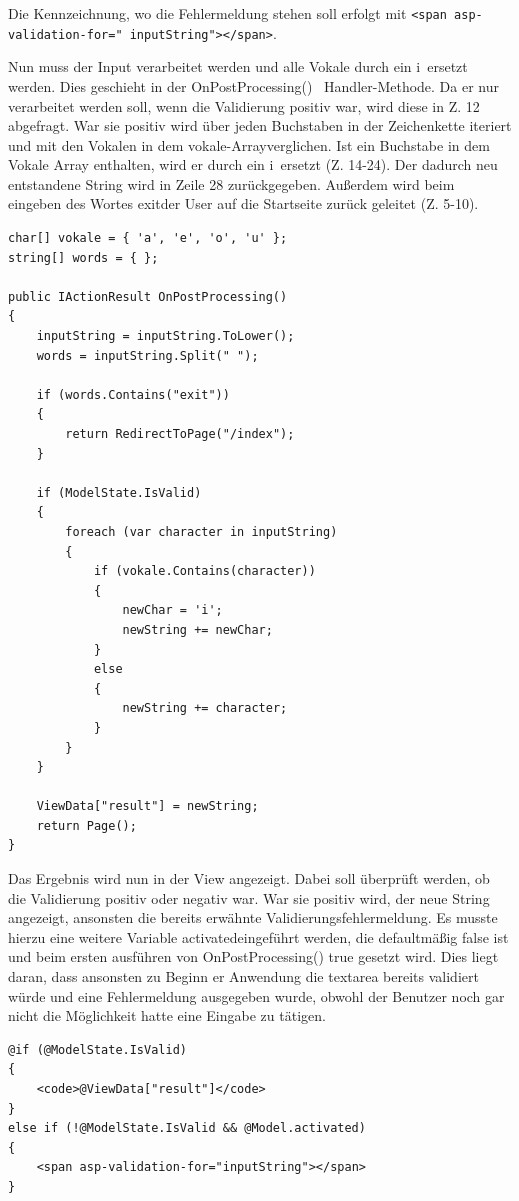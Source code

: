 \documentclass[a4paper,
12pt,
oneside]
{article}
\newcommand{\sPar}{\par\vspace*{6pt}}
\begin{document}
	Die Kennzeichnung, wo die Fehlermeldung stehen soll erfolgt mit \texttt{<span asp-validation-for="{} inputString"{}></span>}. \sPar
	Nun muss der Input verarbeitet werden und alle Vokale durch ein \glqq i\grqq~ersetzt werden. Dies geschieht in der \glqq OnPostProcessing() \grqq~Handler-Methode. Da er nur verarbeitet werden soll, wenn die Validierung positiv war, wird diese in Z. 12 abgefragt. War sie positiv wird über jeden Buchstaben in der Zeichenkette iteriert und mit den Vokalen in dem \glqq vokale-Array\grqq verglichen. Ist ein Buchstabe in dem Vokale Array enthalten, wird er durch ein \glqq i\grqq~ersetzt (Z. 14-24). Der dadurch neu entstandene String wird in Zeile 28 zurückgegeben. Außerdem wird beim eingeben des Wortes \glqq exit\grqq der User auf die Startseite zurück geleitet (Z. 5-10).
	\lstset{style=csharp}
	\begin{lstlisting}
char[] vokale = { 'a', 'e', 'o', 'u' };
string[] words = { };

public IActionResult OnPostProcessing()
{
	inputString = inputString.ToLower();
	words = inputString.Split(" ");
	
	if (words.Contains("exit"))
	{
		return RedirectToPage("/index");
	}
	
	if (ModelState.IsValid)
	{
		foreach (var character in inputString)
		{
			if (vokale.Contains(character))
			{
				newChar = 'i';
				newString += newChar;
			}
			else
			{
				newString += character;
			}
		}
	}
	
	ViewData["result"] = newString;
	return Page();
}
	\end{lstlisting} 
	Das Ergebnis wird nun in der View angezeigt. Dabei soll überprüft werden, ob die Validierung positiv oder negativ war. War sie positiv wird, der neue String angezeigt, ansonsten die bereits erwähnte Validierungsfehlermeldung. Es musste hierzu eine weitere Variable \glqq activated\grqq eingeführt werden, die defaultmäßig false ist und beim ersten ausführen von OnPostProcessing() true gesetzt wird. Dies liegt daran, dass ansonsten zu Beginn er Anwendung die textarea bereits validiert würde und eine Fehlermeldung ausgegeben wurde, obwohl der Benutzer noch gar nicht die Möglichkeit hatte eine Eingabe zu tätigen.
	\lstset{style=cshtml}
	\begin{lstlisting}
@if (@ModelState.IsValid)
{
	<code>@ViewData["result"]</code>
}
else if (!@ModelState.IsValid && @Model.activated)
{
	<span asp-validation-for="inputString"></span>
}
	\end{lstlisting}
	
	
	
\end{document}
